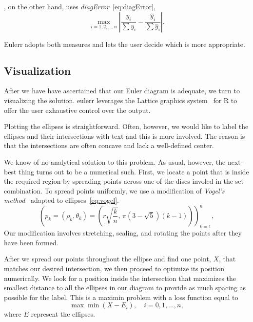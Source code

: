 \documentclass[
  a4paper,
  nofonts,
  nobib,
  titlepage,
  justified,
  marginals=raggedouter,
  nohyper
]{tufte-handout}\usepackage[]{graphicx}\usepackage[]{color}
\newcommand{\pkg}[1]{{\fontseries{b}\selectfont #1}}
\begin{document}
\citet{micallef_2014}, on the other hand, uses \emph{diagError}~\eqref{eq:diagError},
\begin{equation}
\max_{i = 1, 2, \dots, n} \left| \frac{y_i}{\sum y_i} -
  \frac{\hat{y}_i}{\sum \hat{y}_i} \right|.
\label{eq:diagError}
\end{equation}

Eulerr adopts both measures and lets the user decide which is more appropriate.

\subsection{Visualization}

After we have have ascertained that our Euler diagram is adequate, we turn
to visualizing the solution. \pkg{eulerr}
leverages the \pkg{Lattice} graphics system~\citep{sarkar_2008} for \pkg{R} to offer the
user exhaustive control over the output.

Plotting the ellipses is straightforward. Often, however, we would like to label
the ellipses and their intersections with text and this is more involved. The
reason is that the intersections are often concave and lack a well-defined
center.

We know of no analytical solution to this problem. As usual, however,
the next-best thing turns out to be a numerical such. First, we locate a
point that is inside the required region by spreading points across one of the
discs involed in the set combination. To spread points uniformly, we use a
modification of \emph{Vogel's method}~\citep{arthur_2015,vogel_1979} adapted to
ellipses~\cref{eq:vogel}.
\begin{equation}
\left( p_k = (\rho_k, \theta_k) = \left( r \sqrt{\frac{k}{n}},\, \pi (3 - \sqrt{5})(k - 1) \right) \right)_{k=1}^n,
\label{eq:vogel}
\end{equation}
Our modification involves stretching, scaling, and rotating the points
after they have been formed.

After we spread our points throughout the ellipse and find one point, $X$, that
matches our desired intersection, we then proceed to optimize
its position numerically. We look for a position inside the intersection that
maximizes the smallest distance to all the ellipses in our diagram to provide
as much spacing as possible for the label. This is a maximin problem with
a loss function equal to
\begin{equation}
\max{\min{(X-E_i)}},\quad i=0,1, \dots, n,
\label{eq:lossDist}
\end{equation}
where $E$ represent the ellipses.
\end{document}
